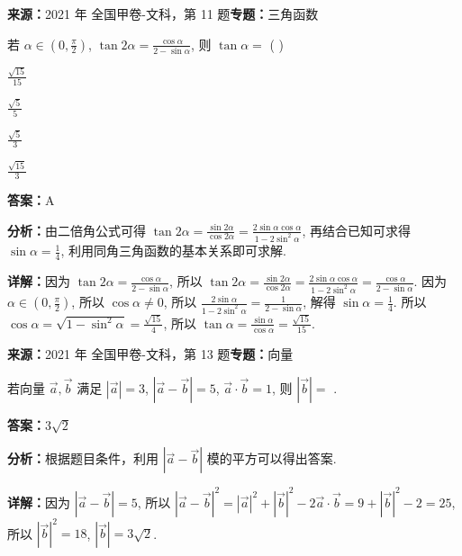 \begin{question}[points=5]
\textbf{来源：}2021 年 全国甲卷-文科，第 11 题\quad \textbf{专题：}三角函数\par
若 $\alpha \in \left(0, \frac{\pi}{2}\right)$, $\tan 2\alpha = \frac{\cos \alpha}{2 - \sin \alpha}$, 则 $\tan \alpha =$ ( )
\begin{choices}
  \item $\frac{\sqrt{15}}{15}$
  \item $\frac{\sqrt{5}}{5}$
  \item $\frac{\sqrt{5}}{3}$
  \item $\frac{\sqrt{15}}{3}$
\end{choices}
\begin{solution}
\textbf{答案：}A

\textbf{分析：}由二倍角公式可得 $\tan 2\alpha = \frac{\sin 2\alpha}{\cos 2\alpha} = \frac{2\sin\alpha\cos\alpha}{1-2\sin^2\alpha}$, 再结合已知可求得 $\sin\alpha = \frac{1}{4}$, 利用同角三角函数的基本关系即可求解.

\textbf{详解：}因为 $\tan 2\alpha = \frac{\cos\alpha}{2-\sin\alpha}$, 所以 $\tan 2\alpha = \frac{\sin 2\alpha}{\cos 2\alpha} = \frac{2\sin\alpha\cos\alpha}{1-2\sin^2\alpha} = \frac{\cos\alpha}{2-\sin\alpha}$. 因为 $\alpha \in \left(0, \frac{\pi}{2}\right)$, 所以 $\cos\alpha \neq 0$, 所以 $\frac{2\sin\alpha}{1-2\sin^2\alpha} = \frac{1}{2-\sin\alpha}$, 解得 $\sin\alpha = \frac{1}{4}$. 所以 $\cos\alpha = \sqrt{1-\sin^2\alpha} = \frac{\sqrt{15}}{4}$, 所以 $\tan\alpha = \frac{\sin\alpha}{\cos\alpha} = \frac{\sqrt{15}}{15}$.
\end{solution}
\end{question}

\begin{question}[points=5]
\textbf{来源：}2021 年 全国甲卷-文科，第 13 题\quad \textbf{专题：}向量\par
若向量 $\vec{a}, \vec{b}$ 满足 $|\vec{a}|=3$, $|\vec{a}-\vec{b}|=5$, $\vec{a}\cdot\vec{b}=1$, 则 $|\vec{b}|=$ .
\fillin[{$3\sqrt{2}$}]
\begin{solution}
\textbf{答案：}$3\sqrt{2}$

\textbf{分析：}根据题目条件，利用 $|\vec{a}-\vec{b}|$ 模的平方可以得出答案.

\textbf{详解：}因为 $|\vec{a}-\vec{b}|=5$, 所以 $|\vec{a}-\vec{b}|^2 = |\vec{a}|^2 + |\vec{b}|^2 - 2\vec{a}\cdot\vec{b} = 9 + |\vec{b}|^2 - 2 = 25$, 所以 $|\vec{b}|^2 = 18$, $|\vec{b}| = 3\sqrt{2}$.
\end{solution}
\end{question}

